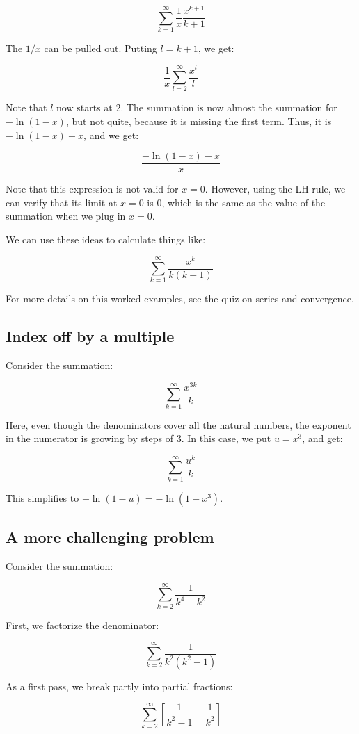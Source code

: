 \documentclass{amsart}
\begin{document}
$$\sum_{k=1}^\infty \frac{1}{x} \frac{x^{k+1}}{k + 1}$$

The $1/x$ can be pulled out. Putting $l = k + 1$, we get:

$$\frac{1}{x} \sum_{l=2}^\infty \frac{x^l}{l}$$

Note that $l$ now starts at $2$. The summation is now almost the
summation for $-\ln(1 - x)$, but not quite, because it is missing the
first term. Thus, it is $-\ln(1 - x) - x$, and we get:

$$\frac{-\ln(1 - x) - x}{x}$$

Note that this expression is not valid for $x = 0$. However, using the
LH rule, we can verify that its limit at $x = 0$ is $0$, which is the
same as the value of the summation when we plug in $x = 0$.

We can use these ideas to calculate things like:

$$\sum_{k=1}^\infty \frac{x^k}{k(k + 1)}$$

For more details on this worked examples, see the quiz on series and
convergence.

\subsection{Index off by a multiple}

Consider the summation:

$$\sum_{k=1}^\infty \frac{x^{3k}}{k}$$

Here, even though the denominators cover all the natural numbers, the
exponent in the numerator is growing by steps of $3$. In this case, we
put $u = x^3$, and get:

$$\sum_{k=1}^\infty \frac{u^k}{k}$$

This simplifies to $-\ln(1 - u) = -\ln(1 - x^3)$.

\subsection{A more challenging problem}

Consider the summation:

$$\sum_{k=2}^\infty \frac{1}{k^4 - k^2}$$

First, we factorize the denominator:

$$\sum_{k=2}^\infty \frac{1}{k^2(k^2 - 1)}$$

As a first pass, we break partly into partial fractions:

$$\sum_{k=2}^\infty \left[\frac{1}{k^2 - 1} - \frac{1}{k^2}\right]$$
\end{document}
